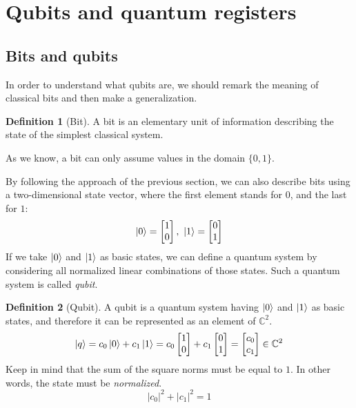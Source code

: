 \documentclass[12pt,a4paper]{report}
\theoremstyle{definition}
\newtheorem{definition}{Definition}[section]
\theoremstyle{definition}
\theoremstyle{definition}
\begin{document}
\section{Qubits and quantum registers}
\subsection{Bits and qubits}
In order to understand what qubits are, we should remark the meaning of classical bits and then make a generalization.
\begin{definition}[Bit]
A bit is an elementary unit of information describing the state of the simplest classical system.
\end{definition}
As we know, a bit can only assume values in the domain $\{0,1\}$.
\begin{center}
\end{center}
By following the approach of the previous section, we can also describe bits using a two-dimensional state vector, where the first element stands for $0$, and the last for $1$:
\begin{equation*}
    \ket{0}=\begin{bmatrix}
        1\\
        0
    \end{bmatrix},\ 
    \ket{1}=\begin{bmatrix}
        0\\
        1
    \end{bmatrix}
\end{equation*}
If we take $\ket{0}$ and $\ket{1}$ as basic states, we can define a quantum system by considering all normalized linear combinations of those states. Such a quantum system is called \textit{qubit}.
\begin{definition}[Qubit]
A qubit is a quantum system having $\ket{0}$ and $\ket{1}$ as basic states, and therefore it can be represented as an element of $\mathbb{C}^2$.
\begin{equation*}
    \ket{q}=c_0\ket{0}+c_1\ket{1}=c_0\begin{bmatrix}
        1\\
        0
    \end{bmatrix}+c_1\begin{bmatrix}
        0\\
        1
    \end{bmatrix}=\begin{bmatrix}
        c_0\\
        c_1
    \end{bmatrix} \in \mathbb{C}^2
\end{equation*}
Keep in mind that the sum of the square norms must be equal to $1$. In other words, the state must be \textit{normalized}.
\begin{equation*}
    \left|c_0\right|^2+\left|c_1\right|^2=1
\end{equation*}
\end{definition}
\end{document}
